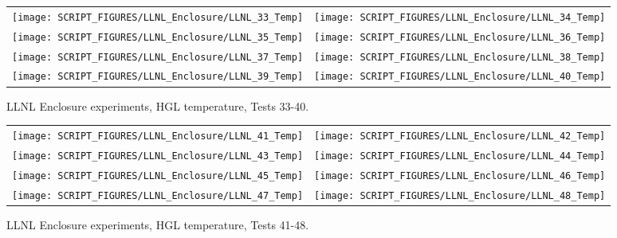 \begin{figure}[p]
\begin{tabular*}{\textwidth}{l@{\extracolsep{\fill}}r}
\texttt{[image: SCRIPT\_FIGURES/LLNL\_Enclosure/LLNL\_33\_Temp]} &
\texttt{[image: SCRIPT\_FIGURES/LLNL\_Enclosure/LLNL\_34\_Temp]} \\
\texttt{[image: SCRIPT\_FIGURES/LLNL\_Enclosure/LLNL\_35\_Temp]} &
\texttt{[image: SCRIPT\_FIGURES/LLNL\_Enclosure/LLNL\_36\_Temp]} \\
\texttt{[image: SCRIPT\_FIGURES/LLNL\_Enclosure/LLNL\_37\_Temp]} &
\texttt{[image: SCRIPT\_FIGURES/LLNL\_Enclosure/LLNL\_38\_Temp]} \\
\texttt{[image: SCRIPT\_FIGURES/LLNL\_Enclosure/LLNL\_39\_Temp]} &
\texttt{[image: SCRIPT\_FIGURES/LLNL\_Enclosure/LLNL\_40\_Temp]}
\end{tabular*}
\caption[LLNL Enclosure experiments, HGL temperature, Tests 33-40]
{LLNL Enclosure experiments, HGL temperature, Tests 33-40.}
\label{LLNL_Enclosure_Temp_5}
\end{figure}

\begin{figure}[p]
\begin{tabular*}{\textwidth}{l@{\extracolsep{\fill}}r}
\texttt{[image: SCRIPT\_FIGURES/LLNL\_Enclosure/LLNL\_41\_Temp]} &
\texttt{[image: SCRIPT\_FIGURES/LLNL\_Enclosure/LLNL\_42\_Temp]} \\
\texttt{[image: SCRIPT\_FIGURES/LLNL\_Enclosure/LLNL\_43\_Temp]} &
\texttt{[image: SCRIPT\_FIGURES/LLNL\_Enclosure/LLNL\_44\_Temp]} \\
\texttt{[image: SCRIPT\_FIGURES/LLNL\_Enclosure/LLNL\_45\_Temp]} &
\texttt{[image: SCRIPT\_FIGURES/LLNL\_Enclosure/LLNL\_46\_Temp]} \\
\texttt{[image: SCRIPT\_FIGURES/LLNL\_Enclosure/LLNL\_47\_Temp]} &
\texttt{[image: SCRIPT\_FIGURES/LLNL\_Enclosure/LLNL\_48\_Temp]}
\end{tabular*}
\caption[LLNL Enclosure experiments, HGL temperature, Tests 41-48]
{LLNL Enclosure experiments, HGL temperature, Tests 41-48.}
\label{LLNL_Enclosure_Temp_6}
\end{figure}

